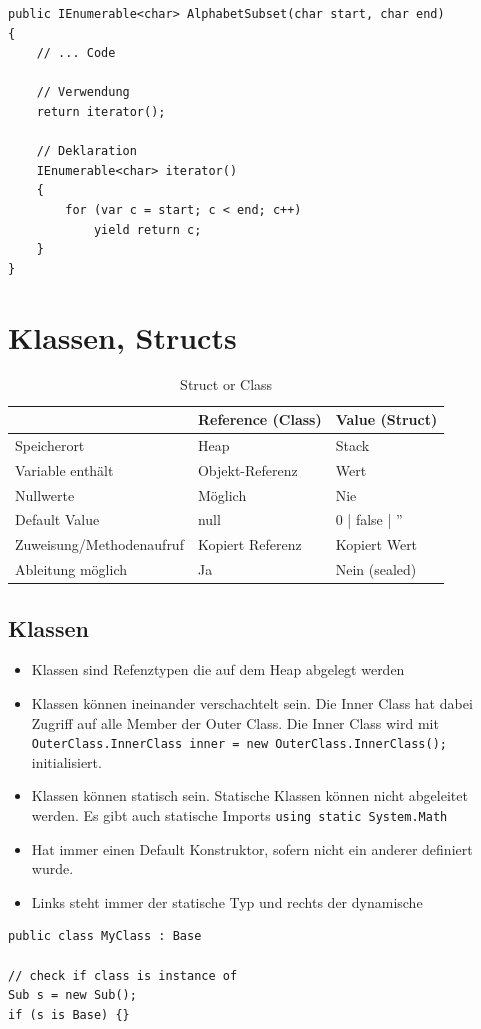 \documentclass[
a4paper,
oneside,
10pt,
fleqn,
headsepline,
toc=listofnumbered, 
bibliography=totocnumbered]{scrartcl}
\let\stdsection\section
\renewcommand\section{\clearpage\stdsection}
\begin{document}
\begin{lstlisting}
public IEnumerable<char> AlphabetSubset(char start, char end)
{
    // ... Code
    
    // Verwendung
    return iterator();
    
    // Deklaration
    IEnumerable<char> iterator()
    {   
        for (var c = start; c < end; c++)
            yield return c;
    }
}
\end{lstlisting}

\section{Klassen, Structs}

\begin{table}[!h]
\centering
\begin{tabular}{lll}
                        \toprule 
                         & Reference (Class) & Value (Struct)    \\
                        \midrule
Speicherort              & Heap              & Stack            \\
Variable enthält         & Objekt-Referenz   & Wert             \\
Nullwerte                & Möglich           & Nie              \\
Default Value            & null              & 0 | false | '' \\
Zuweisung/Methodenaufruf & Kopiert Referenz  & Kopiert Wert     \\
Ableitung möglich        & Ja                & Nein (sealed)   \\
        \bottomrule
\end{tabular}
\caption{Struct or Class}
\label{my-label}
\end{table}

\subsection{Klassen}
\begin{itemize}
	\item Klassen sind Refenztypen die auf dem Heap abgelegt werden
	\item Klassen können ineinander verschachtelt sein. Die Inner Class hat dabei Zugriff auf alle Member der Outer Class. Die Inner Class wird mit \lstinline|OuterClass.InnerClass inner = new OuterClass.InnerClass();| initialisiert.
	\item Klassen können statisch sein. Statische Klassen können nicht abgeleitet werden. Es gibt auch statische Imports \lstinline|using static System.Math|
	\item Hat immer einen Default Konstruktor, sofern nicht ein anderer definiert wurde.
	\item Links steht immer der statische Typ und rechts der dynamische
\end{itemize}
\begin{lstlisting}
public class MyClass : Base

// check if class is instance of
Sub s = new Sub();
if (s is Base) {}
\end{lstlisting}
\end{document}
